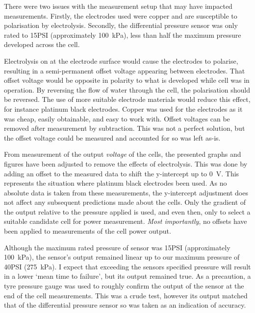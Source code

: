     There were two issues with the measurement setup that may have impacted  measurements.
    Firstly, the electrodes used were copper and are susceptible to polarisation by electrolysis.
    Secondly, the differential pressure sensor was only rated to 15\thinspace PSI (approximately \SI{100}{\kilo\pascal}), less than half the maximum pressure developed across the cell.

    Electrolysis on at the electrode surface would cause the electrodes to polarise, resulting in a semi-permanent offset voltage appearing between electrodes.
    That offset voltage would be opposite in polarity to what is developed while cell was in operation.
    By reversing the flow of water through the cell, the polarisation should be reversed.
    The use of more suitable electrode materials would reduce this effect, for instance platinum black electrodes.
    Copper was used for the electrodes as it was cheap, easily obtainable, and easy to work with.
    Offset voltages can be removed after measurement by subtraction.
    This was not a perfect solution, but the offset voltage could be measured and accounted for so was left as-is.

    From measurement of the output \emph{voltage} of the cells, the presented graphs and figures have been adjusted to remove the effects of electrolysis.
    This was done by adding an offset to the measured data to shift the y-intercept up to \SI{0}{\volt}.
    This represents the situation where platinum black electrodes been used.
    As no absolute data is taken from these measurements, the y-intercept adjustment does not affect any subsequent predictions made about the cells.
    Only the gradient of the output relative to the pressure applied is used, and even then, only to select a suitable candidate cell for power measurement.
    \emph{Most importantly}, no offsets have been applied to measurements of the cell power output.

    Although the maximum rated pressure of sensor was 15\thinspace PSI (approximately \SI{100}{\kilo\pascal}), the sensor's output remained linear up to our maximum pressure of 40\thinspace PSI (\SI{275}{\kilo\pascal}).
    I expect that exceeding the sensors specified pressure will result in a lower `mean time to failure', but its output remained true.
    As a precaution, a tyre pressure gauge was used to roughly confirm the output of the sensor at the end of the cell measurements.
    This was a crude test, however its output matched that of the differential pressure sensor so was taken as an indication of accuracy.


